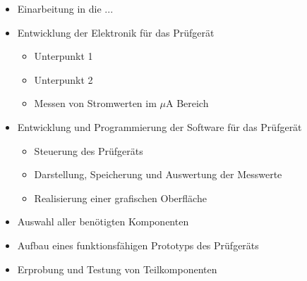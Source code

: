 \begin{itemize}
	\item Einarbeitung in die ...
	\item Entwicklung der Elektronik für das Prüfgerät
	\begin{itemize}
		\item Unterpunkt 1
		\item Unterpunkt 2
		\item Messen von Stromwerten im \(\mu\)A Bereich
	\end{itemize}
	\item Entwicklung und Programmierung der Software für das Prüfgerät
	\begin{itemize}
		\item Steuerung des Prüfgeräts
		\item Darstellung, Speicherung und Auswertung der Messwerte
		\item Realisierung einer grafischen Oberfläche
	\end{itemize}
	\item Auswahl aller benötigten Komponenten
	\item Aufbau eines funktionsfähigen Prototyps des Prüfgeräts
	\item Erprobung und Testung von Teilkomponenten
\end{itemize}